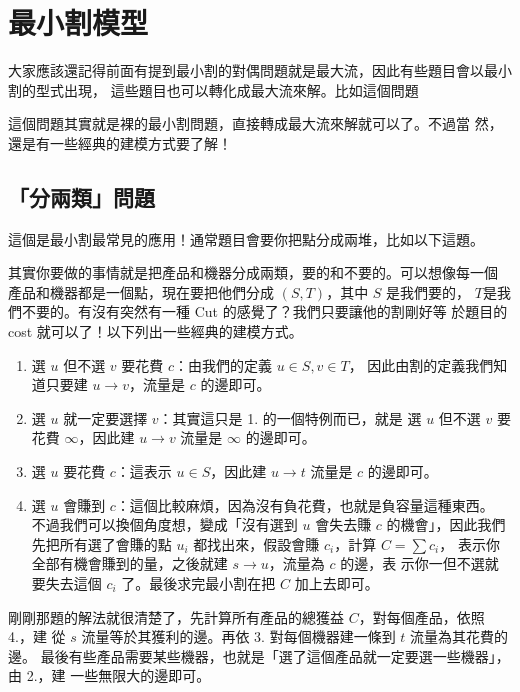 \documentclass[a4paper,12pt]{book}
\begin{document}
\section{最小割模型}
大家應該還記得前面有提到最小割的對偶問題就是最大流，因此有些題目會以最小割的型式出現，
這些題目也可以轉化成最大流來解。比如這個問題


這個問題其實就是裸的最小割問題，直接轉成最大流來解就可以了。不過當
然，還是有一些經典的建模方式要了解！

\subsection{「分兩類」問題}
這個是最小割最常見的應用！通常題目會要你把點分成兩堆，比如以下這題。


其實你要做的事情就是把產品和機器分成兩類，要的和不要的。可以想像每一個
產品和機器都是一個點，現在要把他們分成 $(S, T)$，其中 $S$ 是我們要的，
$T$是我們不要的。有沒有突然有一種 Cut 的感覺了？我們只要讓他的割剛好等
於題目的 cost 就可以了！以下列出一些經典的建模方式。
\begin{enumerate}
  \item 選 $u$ 但不選 $v$ 要花費 $c$：由我們的定義 $u \in S, v \in T$，
    因此由割的定義我們知道只要建 $u \rightarrow v$，流量是 $c$ 的邊即可。
  \item 選 $u$ 就一定要選擇 $v$：其實這只是 1. 的一個特例而已，就是
    選 $u$ 但不選 $v$ 要花費 $\infty$，因此建 $u \rightarrow v$ 流量是 $\infty$ 
    的邊即可。
  \item 選 $u$ 要花費 $c$：這表示 $u \in S$，因此建 $u \rightarrow t$ 流量是
    $c$ 的邊即可。
  \item 選 $u$ 會賺到 $c$：這個比較麻煩，因為沒有負花費，也就是負容量這種東西。
    不過我們可以換個角度想，變成「沒有選到 $u$ 會失去賺 $c$ 的機會」，因此我們
    先把所有選了會賺的點 $u_i$ 都找出來，假設會賺 $c_i$，計算 $C = \sum c_i$，
    表示你全部有機會賺到的量，之後就建 $s \rightarrow u$，流量為 $c$ 的邊，表
    示你一但不選就要失去這個 $c_i$ 了。最後求完最小割在把 $C$ 加上去即可。
\end{enumerate}
剛剛那題的解法就很清楚了，先計算所有產品的總獲益 $C$，對每個產品，依照 4.，建
從 $s$ 流量等於其獲利的邊。再依 3. 對每個機器建一條到 $t$ 流量為其花費的邊。
最後有些產品需要某些機器，也就是「選了這個產品就一定要選一些機器」，由 2.，建
一些無限大的邊即可。
\end{document}
